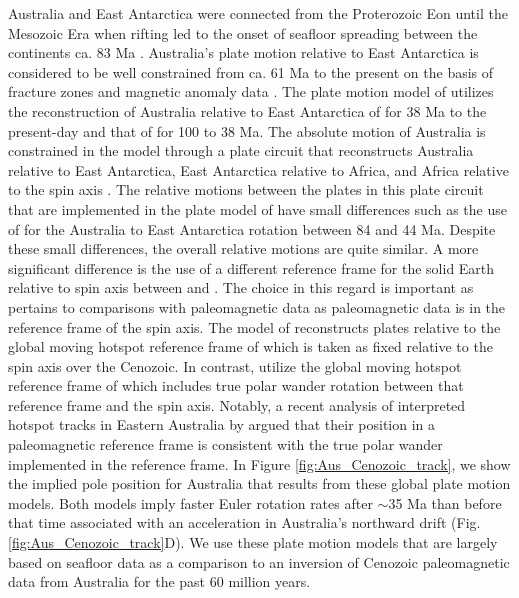 \documentclass[11pt,letterpaper]{article}
\begin{document}
Australia and East Antarctica were connected from the Proterozoic Eon until the Mesozoic Era when rifting led to the onset of seafloor spreading between the continents ca. 83 Ma \citep{Williams2011a, Veevers2012a}. Australia's plate motion relative to East Antarctica is considered to be well constrained from ca. 61 Ma to the present on the basis of fracture zones and magnetic anomaly data \citep{Cande2004a}. The plate motion model of \cite{Muller2016a} utilizes the reconstruction of Australia relative to East Antarctica of \cite{Cande2004a} for 38 Ma to the present-day and that of \cite{Whittaker2007a} for 100 to 38 Ma. The absolute motion of Australia is constrained in the model through a plate circuit that reconstructs Australia relative to East Antarctica, East Antarctica relative to Africa, and Africa relative to the spin axis \citep{Muller2016a}. The relative motions between the plates in this plate circuit that are implemented in the plate model of \cite{Torsvik2017a} have small differences such as the use of \cite{Tikku2000a} for the Australia to East Antarctica rotation between 84 and 44 Ma. Despite these small differences, the overall relative motions are quite similar. A more significant difference is the use of a different reference frame for the solid Earth relative to spin axis between \cite{Muller2016a} and \cite{Torsvik2017a}. The choice in this regard is important as pertains to comparisons with paleomagnetic data as paleomagnetic data is in the reference frame of the spin axis. The model of \cite{Muller2016a} reconstructs plates relative to the global moving hotspot reference frame of \cite{Torsvik2008a} which is taken as fixed relative to the spin axis over the Cenozoic. In contrast, \cite{Torsvik2017a} utilize the global moving hotspot reference frame of \cite{Doubrovine2012a} which includes true polar wander rotation between that reference frame and the spin axis. Notably, a recent analysis of interpreted hotspot tracks in Eastern Australia by \cite{Hansma2020a} argued that their position in a paleomagnetic reference frame is consistent with the true polar wander implemented in the \cite{Doubrovine2012a} reference frame. In Figure \ref{fig:Aus_Cenozoic_track}, we show the implied pole position for Australia that results from these global plate motion models. Both models imply faster Euler rotation rates after $\sim$35 Ma than before that time associated with an acceleration in Australia's northward drift (Fig. \ref{fig:Aus_Cenozoic_track}D). We use these plate motion models that are largely based on seafloor data as a comparison to an inversion of Cenozoic paleomagnetic data from Australia for the past 60 million years.
\end{document}
